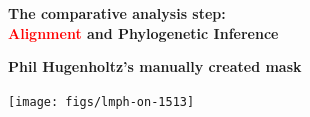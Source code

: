 \documentclass[landscape]{slides}
\begin{document}
\begin{slide}
\begin{center}

\textbf{The comparative analysis step: \\ \textcolor{red}{Alignment} and Phylogenetic Inference}
\end{center}

\vfill
\end{slide}
\begin{slide}
\begin{center}

\textbf{Phil Hugenholtz's manually created mask}
\end{center}
\small

\begin{center}
\texttt{[image: figs/lmph-on-1513]}

\end{center}
\vfill
\end{slide}
\end{document}
